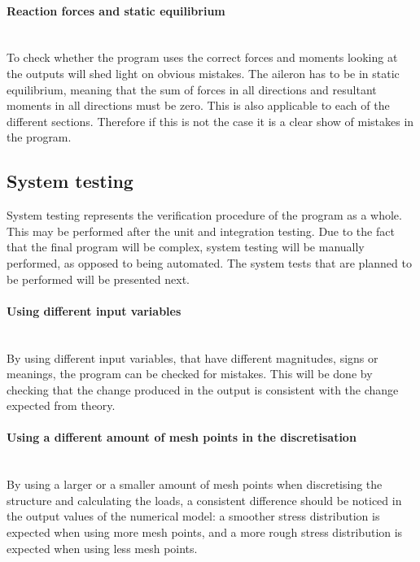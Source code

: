 \paragraph{Reaction forces and static equilibrium}\mbox{}\\
\noindent To check whether the program uses the correct forces and moments looking at the outputs will shed light on obvious mistakes. The aileron has to be in static equilibrium, meaning that the sum of forces in all directions and resultant moments in all directions must be zero. This is also applicable to each of the different sections. Therefore if this is not the case it is a clear show of mistakes in the program.


\subsection{System testing}
System testing represents the verification procedure of the program as a whole. This may be performed after the unit and integration testing. Due to the fact that the final program will be complex, system testing will be manually performed, as opposed to being automated. The system tests that are planned to be performed will be presented next.

\paragraph{Using different input variables}\mbox{}\\
\noindent By using different input variables, that have different magnitudes, signs or meanings, the program can be checked for mistakes. This will be done by checking that the change produced in the output is consistent with the change expected from theory.   

\paragraph{Using a different amount of mesh points in the discretisation}\mbox{}\\
\noindent By using a larger or a smaller amount of mesh points when discretising the structure and calculating the loads, a consistent difference should be noticed in the output values of the numerical model: a smoother stress distribution is expected when using more mesh points, and a more rough stress distribution is expected when using less mesh points.


